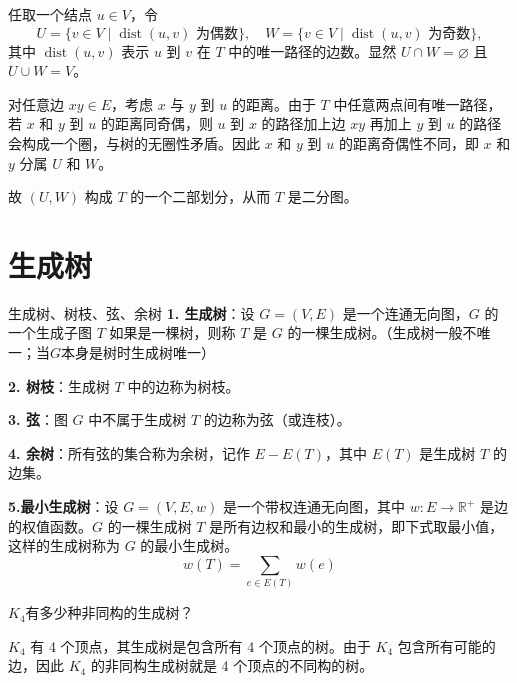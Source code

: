 任取一个结点 \(u \in V\)，令
\[
U = \{ v \in V \mid \operatorname{dist}(u, v) \text{ 为偶数} \},
\quad W = \{ v \in V \mid \operatorname{dist}(u, v) \text{ 为奇数} \},
\]
其中 \(\operatorname{dist}(u, v)\) 表示 \(u\) 到 \(v\) 在 \(T\) 中的唯一路径的边数。显然 \(U \cap W = \varnothing\) 且 \(U \cup W = V\)。

对任意边 \(xy \in E\)，考虑 \(x\) 与 \(y\) 到 \(u\) 的距离。由于 \(T\) 中任意两点间有唯一路径，若 \(x\) 和 \(y\) 到 \(u\) 的距离同奇偶，则 \(u\) 到 \(x\) 的路径加上边 \(xy\) 再加上 \(y\) 到 \(u\) 的路径会构成一个圈，与树的无圈性矛盾。因此 \(x\) 和 \(y\) 到 \(u\) 的距离奇偶性不同，即 \(x\) 和 \(y\) 分属 \(U\) 和 \(W\)。

故 \((U, W)\) 构成 \(T\) 的一个二部划分，从而 \(T\) 是二分图。
\section{生成树}
\begin{definition}{生成树、树枝、弦、余树}{}
    \textbf{1. 生成树}：设 $G = (V, E)$ 是一个连通无向图，$G$ 的一个生成子图 $T$ 如果是一棵树，则称 $T$ 是 $G$ 的一棵生成树。（生成树一般不唯一；当$G$本身是树时生成树唯一）

    \textbf{2. 树枝}：生成树 $T$ 中的边称为树枝。

    \textbf{3. 弦}：图 $G$ 中不属于生成树 $T$ 的边称为弦（或连枝）。

    \textbf{4. 余树}：所有弦的集合称为余树，记作 $E - E(T)$，其中 $E(T)$ 是生成树 $T$ 的边集。

    \textbf{5.最小生成树}：设 $G=(V,E,w)$ 是一个带权连通无向图，其中 $w:E \to \mathbb{R}^+$ 是边的权值函数。$G$ 的一棵生成树 $T$ 是所有边权和最小的生成树，即下式取最小值，这样的生成树称为 $G$ 的最小生成树。
    \[
    w(T) = \sum_{e \in E(T)} w(e)
    \]
\end{definition}
\begin{example}{}{}
    $K_4$有多少种非同构的生成树？
\end{example}
$K_4$ 有 4 个顶点，其生成树是包含所有 4 个顶点的树。由于 $K_4$ 包含所有可能的边，因此 $K_4$ 的非同构生成树就是 4 个顶点的不同构的树。

